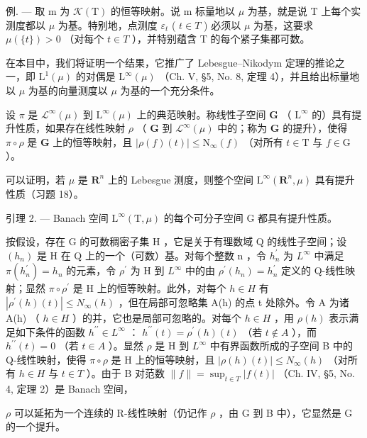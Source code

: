 例. --- 取 m 为 \(\mathcal{K}(\mathrm{T})\) 的恒等映射。说 m 标量地以 \(\mu\) 为基，就是说 T 上每个实测度都以 \(\mu\) 为基。特别地，点测度 \(\varepsilon_{t}\) ( \(t \in T\) ) 必须以 \(\mu\) 为基，这要求 \(\mu(\{t\}) > 0\) （对每个 \(t \in T\) ），并特别蕴含 T 的每个紧子集都可数。

在本目中，我们将证明一个结果，它推广了 Lebesgue--Nikodym 定理的推论之一，即 \(\mathrm{L}^{1}(\mu)\) 的对偶是 \(\mathrm{L}^{\infty}(\mu)\) （Ch. V, §5, No. 8, 定理 4），并且给出标量地以 \(\mu\) 为基的向量测度以 \(\mu\) 为基的一个充分条件。

设 \(\pi\) 是 \(\mathcal{L}^{\infty}(\mu)\) 到 \(\mathrm{L}^{\infty}(\mu)\) 上的典范映射。称线性子空间 \(\mathbf{G}\) （ \(\mathrm{L}^{\infty}\) 的）具有提升性质，如果存在线性映射 \(\rho\) （ \(\mathbf{G}\) 到 \(\mathcal{L}^{\infty}(\mu)\) 中的；称为 \(\mathbf{G}\) 的提升），使得 \(\pi \circ \rho\) 是 \(\mathbf{G}\) 上的恒等映射，且 \(|\rho(f)(t)| \leqslant \mathrm{N}_{\infty}(f)\) （对所有 \(t \in \mathrm{T}\) 与 \(f \in \mathrm{G}\) ）。

可以证明，若 \(\mu\) 是 \(\mathbf{R}^n\) 上的 Lebesgue 测度，则整个空间 \(\mathrm{L}^{\infty}(\mathbf{R}^{n},\mu)\) 具有提升性质（习题 18）。

引理 2. --- Banach 空间 \(\mathrm{L}^{\infty}(\mathrm{T},\mu)\) 的每个可分子空间 G 都具有提升性质。

按假设，存在 G 的可数稠密子集 H ，它是关于有理数域 Q 的线性子空间；设 \((h_{n})\) 是 H 在 Q 上的一个（可数）基。对每个整数 n ，令 \(h_{n}^{\prime}\) 为 \(L^{\infty}\) 中满足 \(\pi(h_{n}^{\prime}) = h_{n}\) 的元素，令 \(\rho^{\prime}\) 为 H 到 \(L^{\infty}\) 中的由 \(\rho^{\prime}(h_{n}) = h_{n}^{\prime}\) 定义的 Q-线性映射；显然 \(\pi \circ \rho^{\prime}\) 是 H 上的恒等映射。此外，对每个 \(h \in H\) 有 \(|\rho^{\prime}(h)(t)| \leqslant N_{\infty}(h)\) ，但在局部可忽略集 A(h) 的点 t 处除外。令 A 为诸 A(h) （ \(h \in H\) ）的并，它也是局部可忽略的。对每个 \(h \in H\) ，用 \(\rho(h)\) 表示满足如下条件的函数 \(h^{\prime\prime} \in L^{\infty}\) ： \(h^{\prime\prime}(t) = \rho^{\prime}(h)(t)\) （若 \(t \notin A\) ），而 \(h^{\prime\prime}(t) = 0\) （若 \(t \in A\) ）。显然 \(\rho\) 是 H 到 \(L^{\infty}\) 中有界函数所成的子空间 B 中的 Q-线性映射，使得 \(\pi \circ \rho\) 是 H 上的恒等映射，且 \(|\rho(h)(t)| \leqslant N_{\infty}(h)\) （对所有 \(h \in H\) 与 \(t \in T\) ）。由于 B 对范数 \(\|f\| = \sup_{t \in T} |f(t)|\) （Ch. IV, §5, No. 4, 定理 2）是 Banach 空间，

\(\rho\) 可以延拓为一个连续的 R-线性映射（仍记作 \(\rho\) ，由 G 到 B 中），它显然是 G 的一个提升。

